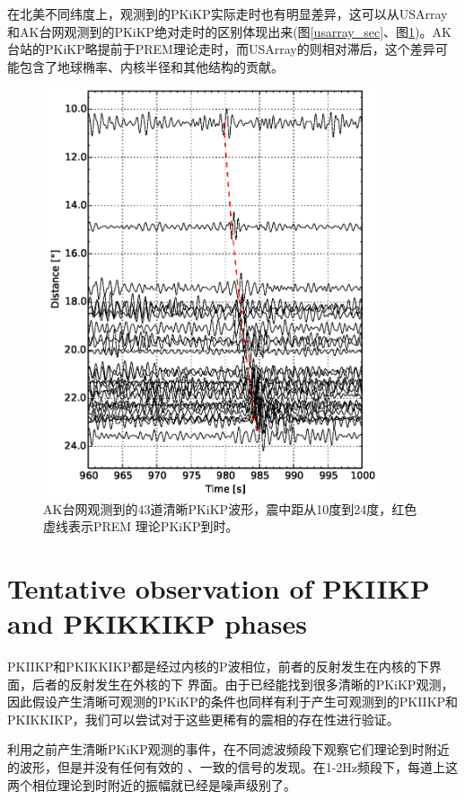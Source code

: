 在北美不同纬度上，观测到的PKiKP实际走时也有明显差异，这可以从USArray和AK台网观测到的PKiKP绝对走时的区别体现出来(图\ref{usarray_sec}、图\ref{ak_sec})。AK台站的PKiKP略提前于PREM理论走时，而USArray的则相对滞后，这个差异可能包含了地球椭率、内核半径和其他结构的贡献。

\begin{figure}[!ht]
	\centering
	\includegraphics[width=10cm,height=12cm]{fig/chap3/ak_sec.eps}
	\caption{AK台网观测到的43道清晰PKiKP波形，震中距从10度到24度，红色虚线表示PREM%
理论PKiKP到时。}
	\label{ak_sec}
\end{figure}

\newpage

\section{Tentative observation of PKIIKP and PKIKKIKP phases}

PKIIKP和PKIKKIKP都是经过内核的P波相位，前者的反射发生在内核的下界面，后者的反射发生在外核的下
界面。由于已经能找到很多清晰的PKiKP观测，因此假设产生清晰可观测的PKiKP的条件也同样有利于产生可观测到的PKIIKP和PKIKKIKP，我们可以尝试对于这些更稀有的震相的存在性进行验证。

利用之前产生清晰PKiKP观测的事件，在不同滤波频段下观察它们理论到时附近的波形，但是并没有任何有效的
、一致的信号的发现。在1-2Hz频段下，每道上这两个相位理论到时附近的振幅就已经是噪声级别了。

